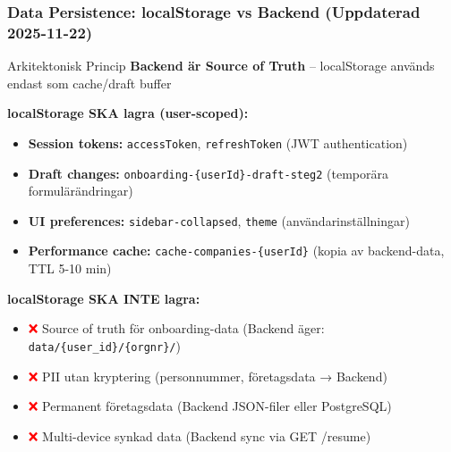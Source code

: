 \documentclass[10pt]{beamer}
\begin{document}
\begin{frame}[label=localstorage-strategy]
  \frametitle{Data Persistence: localStorage vs Backend (Uppdaterad 2025-11-22)}

  \footnotesize

  \begin{alertblock}{Arkitektonisk Princip}
    \tiny \textbf{Backend är Source of Truth} – localStorage används endast som cache/draft buffer
  \end{alertblock}

  \vspace{0.3cm}

  \textbf{localStorage SKA lagra (user-scoped):}\\
  \begin{itemize}
    \tiny
    \item \textbf{Session tokens:} \texttt{accessToken}, \texttt{refreshToken} (JWT authentication)
    \item \textbf{Draft changes:} \texttt{onboarding-\{userId\}-draft-steg2} (temporära formulärändringar)
    \item \textbf{UI preferences:} \texttt{sidebar-collapsed}, \texttt{theme} (användarinställningar)
    \item \textbf{Performance cache:} \texttt{cache-companies-\{userId\}} (kopia av backend-data, TTL 5-10 min)
  \end{itemize}

  \vspace{0.3cm}

  \textbf{localStorage SKA INTE lagra:}\\
  \begin{itemize}
    \tiny
    \item \textcolor{red}{❌} Source of truth för onboarding-data (Backend äger: \texttt{data/\{user\_id\}/\{orgnr\}/})
    \item \textcolor{red}{❌} PII utan kryptering (personnummer, företagsdata → Backend)
    \item \textcolor{red}{❌} Permanent företagsdata (Backend JSON-filer eller PostgreSQL)
    \item \textcolor{red}{❌} Multi-device synkad data (Backend sync via GET /resume)
  \end{itemize}

  \vspace{0.3cm}


\end{frame}
\end{document}
